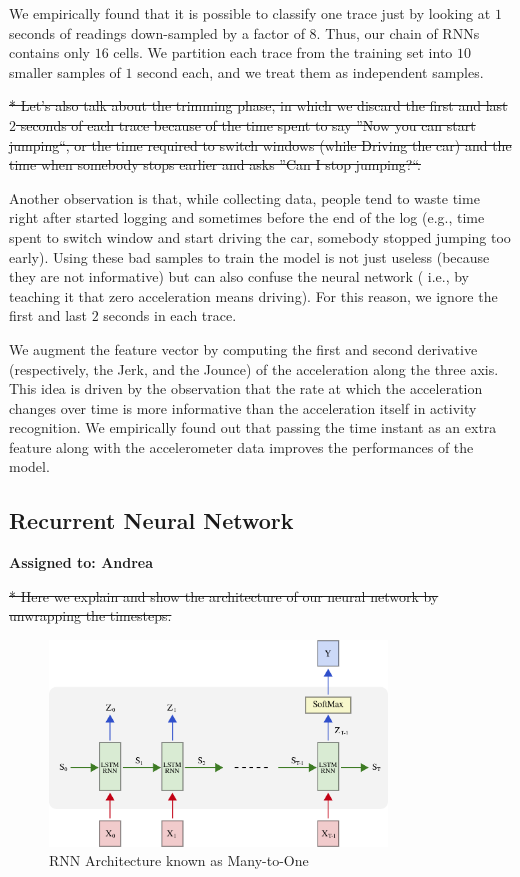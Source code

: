 \documentclass{article}
\begin{document}
We empirically found that it is possible to classify one trace just by looking at $1$ seconds of
readings down-sampled by a factor of $8$. Thus, our chain of RNNs contains only $16$ cells.
We partition each trace from the training set into $10$ smaller samples of $1$ second each, 
and we treat them as independent samples.


\st{* Let's also talk about the trimming phase, in which we discard the first and last $2$ seconds
of each trace because of the time spent to say ''Now you can start jumping``, or the time
required to switch windows (while Driving the car) and the time when somebody stops earlier and
asks ''Can I stop jumping?``.}

Another observation is that, while collecting data, people tend to waste time right after started
logging and sometimes before the end of the log (e.g., time spent to switch window and start
driving the car, somebody stopped jumping too early). Using these bad samples to train the model
is not just useless (because they are not informative) but can also confuse the neural network (
i.e., by teaching it that zero acceleration means driving). For this reason, we ignore the first and 
last $2$ seconds in each trace.

We augment the feature vector by computing the first and second derivative (respectively, 
the Jerk, and the Jounce) of the acceleration along the three axis. This idea is driven by the
observation that the rate at which the acceleration changes over time is more informative
than the acceleration itself in activity recognition. We empirically found out that passing
the time instant as an extra feature along with the accelerometer data improves the performances
of the model.


\subsection{Recurrent Neural Network}
\vspace{-.3cm}
\textbf{Assigned to: Andrea}

\st{* Here we explain and show the architecture of our neural network by unwrapping the timesteps.}

\begin{figure}[t]
    \centering
    \vspace{-8pt}
    \includegraphics[width=0.8\textwidth]{figures/rnn_full}
    \caption{RNN Architecture known as Many-to-One \label{fig:rnn_architecture}}
    \vspace{-6pt}
\end{figure}
\end{document}
